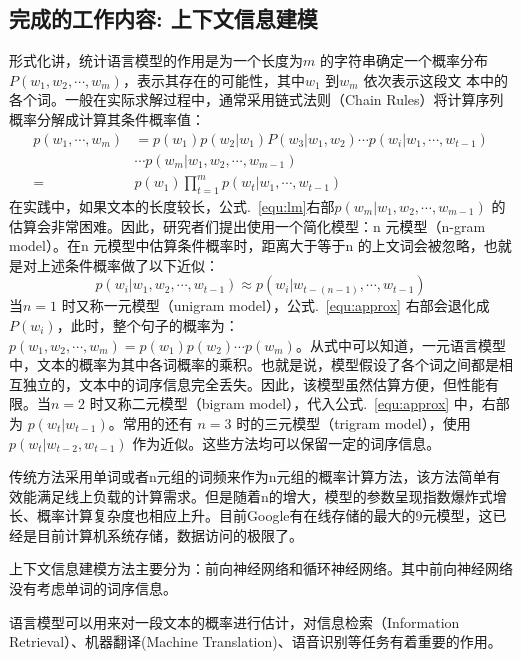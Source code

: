 \documentclass[master,openright,twoside,color]{buaathesis}
\begin{document}
\subsection{完成的工作内容: 上下文信息建模}
形式化讲，统计语言模型的作用是为一个长度为$m$ 的字符串确定一个概率分布$P(w_1,w_2,\cdots,w_m)$，表示其存在的可能性，其中$w_1$ 到$w_m$ 依次表示这段文
本中的各个词。一般在实际求解过程中，通常采用链式法则（Chain Rules）将计算序列概率分解成计算其条件概率值：
\begin{equation}
\label{equ:lm}
\begin{split}
p(w_1,\cdots,w_m) &= p(w_1) p(w_2|w_1) P(w_3|w_1,w_2)\cdots p(w_i | w_1,\cdots,w_{t-1}) \\
&\cdots p(w_m | w_1,w_2,\cdots,w_{m-1}) \\
=&p(w_1)\prod_{t=1}^{m}p(w_t|w_1,\cdots,w_{t-1})
\end{split}
\end{equation}
在实践中，如果文本的长度较长，公式.~\ref{equ:lm}右部$ p(w_m | w_1,w_2,\cdots,w_{m-1}) $ 的估算会非常困难。因此，研究者们提出使用一个简化模型：n 元模型（n-gram model）。在n 元模型中估算条件概率时，距离大于等于n 的上文词会被忽略，也就是对上述条件概率做了以下近似：
\begin{equation}
\label{equ:approx}
p(w_i | w_1,w_2,\cdots,w_{t-1})  \approx p(w_i | w_{t-(n-1)},\cdots,w_{t-1})
\end{equation}
当$n = 1$ 时又称一元模型（unigram model），公式.~\ref{equ:approx} 右部会退化成$P(w_i)$，此时，整个句子的概率为：$p(w_1,w_2,\cdots,w_m) = p(w_1)p(w_2) \cdots p(w_m)$。从式中可以知道，一元语言模型中，文本的概率为其中各词概率的乘积。也就是说，模型假设了各个词之间都是相互独立的，文本中的词序信息完全丢失。因此，该模型虽然估算方便，但性能有限。当$n = 2$ 时又称二元模型（bigram model），代入公式.~\ref{equ:approx} 中，右部为 $p(w_t|w_{t-1})$。常用的还有 $n = 3$ 时的三元模型（trigram model），使用$p(w_t |w_{t-2},w_{t-1})$ 作为近似。这些方法均可以保留一定的词序信息。

传统方法采用单词或者n元组的词频来作为n元组的概率计算方法，该方法简单有效能满足线上负载的计算需求。但是随着n的增大，模型的参数呈现指数爆炸式增长、概率计算复杂度也相应上升。目前Google有在线存储的最大的9元模型，这已经是目前计算机系统存储，数据访问的极限了。


上下文信息建模方法主要分为：前向神经网络和循环神经网络。其中前向神经网络没有考虑单词的词序信息。


语言模型可以用来对一段文本的概率进行估计，对信息检索（Information Retrieval）、机器翻译(Machine Translation)、语音识别等任务有着重要的作用。
\end{document}
